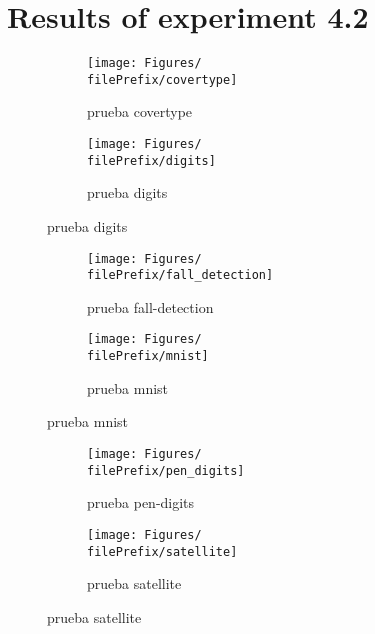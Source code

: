 
\newcommand{\major}{4}
\newcommand{\minor}{2}

\newcommand{\undPrefix}{\major_\minor}
\newcommand{\dotPrefix}{\major.\minor}
\newcommand{\scoPrefix}{\major-\minor}
\newcommand{\filePrefix}{\undPrefix/rff}

\chapter{Results of experiment \dotPrefix} %


\label{Appendix\scoPrefix} %


\begin{figure}[ht]
  \centering
  \begin{subfigure}[b]{0.5\linewidth}
    \centering\texttt{[image: Figures/\\filePrefix/covertype]}
    \caption{prueba covertype}
    \label{fig:\undPrefix_covertype}
  \end{subfigure}%
  \begin{subfigure}[b]{0.5\linewidth}
    \centering\texttt{[image: Figures/\\filePrefix/digits]}
    \caption{prueba digits}
    \label{fig:\undPrefix_digits}
  \end{subfigure}
\end{figure}


\begin{figure}[ht]
  \centering
  \begin{subfigure}[b]{0.5\linewidth}
    \centering\texttt{[image: Figures/\\filePrefix/fall\_detection]}
    \caption{prueba fall-detection}
    \label{fig:\undPrefix_fall_detection}
  \end{subfigure}%
  \begin{subfigure}[b]{0.5\linewidth}
    \centering\texttt{[image: Figures/\\filePrefix/mnist]}
    \caption{prueba mnist}
    \label{fig:\undPrefix_mnist}
  \end{subfigure}
\end{figure}


\begin{figure}[ht]
  \centering
  \begin{subfigure}[b]{0.5\linewidth}
    \centering\texttt{[image: Figures/\\filePrefix/pen\_digits]}
    \caption{prueba pen-digits}
    \label{fig:\undPrefix_pen_digits}
  \end{subfigure}%
  \begin{subfigure}[b]{0.5\linewidth}
    \centering\texttt{[image: Figures/\\filePrefix/satellite]}
    \caption{prueba satellite}
    \label{fig:\undPrefix_satellite}
  \end{subfigure}
\end{figure}

